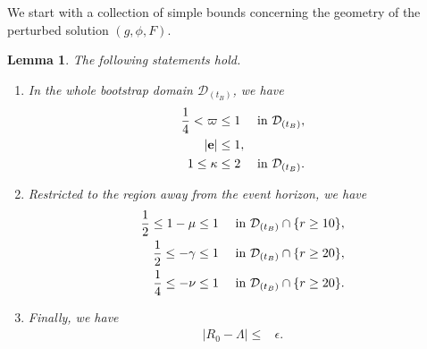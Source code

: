 \documentclass[10pt, reqno]{amsart}
\newtheorem{lemma}[theorem]{Lemma}
\theoremstyle{definition}
\theoremstyle{remark}
\theoremstyle{conjecture}
\numberwithin{equation}{section}
\newcommand{\abs}[1]{\vert#1\vert}
\newcommand{\set}[1]{\{#1\}}
\newcommand{\0}{\emptyset}
\newcommand{\gmm}{\gamma}
\newcommand{\eps}{\epsilon}
\newcommand{\kpp}{\kappa}
\newcommand{\lmb}{\lambda}
\newcommand{\Lmb}{\Lambda}
\newcommand{\bfe}{{\bf e}}
\newcommand{\calD}{\mathcal D}
\newcommand{\dur}{\nu}
\newcommand{\dvr}{\lmb}
\newcommand{\e}{\bfe}							%
\begin{document}
We start with a collection of simple bounds concerning the geometry of the perturbed solution $(g, \phi, F)$.
\begin{lemma} \label{lem:geom-prelim}
The following statements hold. 
\begin{enumerate}
\item In the whole bootstrap domain $\calD_{(t_{B})}$, we have
\begin{align} 
	\frac{1}{4} < \varpi \leq 1 & \quad \hbox{ in } \calD_{(t_{B})}, \label{eq:m-bnd}  \\
		\abs{\e} \leq 1 &, 		\label{eq:e-bnd}  \\
	1 \leq \kpp \leq 2 & \quad \hbox{ in } \calD_{(t_{B})}. \label{eq:kpp-bnd}  
\end{align}
\item Restricted to the region away from the event horizon, we have 
\begin{align} 
	\frac{1}{2} \leq 1-\mu \leq 1 & \quad \hbox{ in } \calD_{(t_{B})} \cap \set{r \geq 10}, \label{eq:mu-large-r}  \\
	 \frac{1}{2} \leq - \gmm \leq 1 & \quad \hbox{ in } \calD_{(t_{B})} \cap \set{r \geq 20}, \label{eq:gmm-large-r}  \\
	 \frac{1}{4} \leq - \dur \leq 1 & \quad \hbox{ in } \calD_{(t_{B})} \cap \set{r \geq 20}. \label{eq:dur-large-r}  
\end{align}
\item Finally, we have
\begin{align}  
	\abs{R_{0} - \Lmb} \leq & \eps.  \label{eq:R0-Lmb}
\end{align}
\end{enumerate}
\end{lemma}
\end{document}
